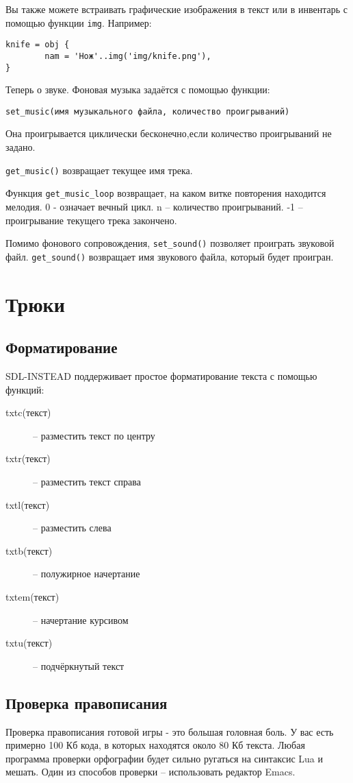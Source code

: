 \documentclass[a4paper,12pt]{article}
\begin{document}
Вы также можете встраивать графические изображения в текст или в инвентарь с помощью функции \verb/img/. Например:

\begin{verbatim}
knife = obj {
        nam = 'Нож'..img('img/knife.png'),
}
\end{verbatim}

Теперь о звуке. Фоновая музыка задаётся с помощью функции: 

\begin{verbatim}
set_music(имя музыкального файла, количество проигрываний)
\end{verbatim}

Она проигрывается циклически бесконечно,если количество проигрываний не задано.

\verb/get_music()/ возвращает текущее имя трека.

Функция \verb/get_music_loop/ возвращает, на каком витке повторения находится мелодия. 0 - означает вечный цикл. n -- количество проигрываний. -1 -- проигрывание текущего трека закончено.

Помимо фонового сопровождения, \verb/set_sound()/ позволяет проиграть звуковой файл. \verb/get_sound()/ возвращает имя звукового файла, который будет проигран.

\section{Трюки}
\subsection{Форматирование}
SDL-INSTEAD поддерживает простое форматирование текста с помощью функций:

\begin{description}
\item[txtc(текст)] -- разместить текст по центру
\item[txtr(текст)] -- разместить текст справа
\item[txtl(текст)] -- разместить слева
\item[txtb(текст)] -- полужирное начертание
\item[txtem(текст)] -- начертание курсивом
\item[txtu(текст)] -- подчёркнутый текст
\end{description}

\subsection{Проверка правописания}
Проверка правописания готовой игры - это большая головная боль. У вас есть примерно 100 Кб кода, в которых находятся около 80 Кб текста. Любая программа проверки орфографии будет сильно ругаться на синтаксис Lua и мешать. Один из способов проверки -- использовать редактор Emacs.
\end{document}
